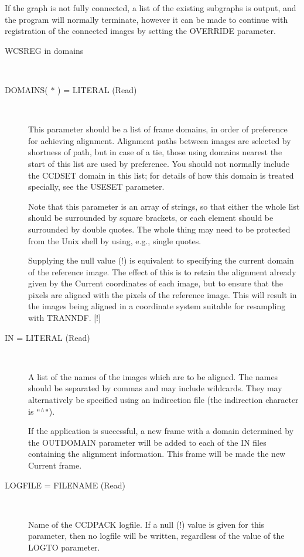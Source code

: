 \documentclass[twoside,11pt]{article}
\newcommand{\htmlref}[2]{#1}
\renewcommand{\_}{\texttt{\symbol{95}}}
\newcommand{\qt}[1]{{\tt "}#1{\tt "}}
\newcommand{\xroutine}[1]{\htmlref{{\sc #1}}{#1}}
\newcommand{\sstusage}[1]{\item[Usage:] \mbox{}
   \begin{description}
      {\ssttt \item #1}
   \end{description}
}
\newcommand{\sstparameters}[1]{
   \item[Parameters:] \mbox{} \\
   \vspace{-3.5ex}
   \begin{description}
      #1
   \end{description}
}
\newcommand{\sstsubsection}[1]{ \item[{#1}] \mbox{} \\}
\newcommand{\sstusage}[1]{\item[Usage:]
      \begin{description}
         {\ssttt #1}
      \end{description}
      \\
   }
\newcommand{\sstparameters}[1]{
      \item[Parameters:] \\
      \begin{description}
         #1
      \end{description}
      \\
   }
\newcommand{\sstsubsection}[1]{\item[{#1}]}
\begin{document}
{{      If the graph is not fully connected, a list of the existing
      subgraphs is output, and the program will normally terminate,
      however it can be made to continue with registration of the
      connected images by setting the OVERRIDE parameter.
   }
   \sstusage{
      WCSREG in domains
   }
   \sstparameters{
      \sstsubsection{
         DOMAINS( $*$ ) = LITERAL (Read)
      } {
         This parameter should be a list of frame domains, in order
         of preference for achieving alignment.  Alignment paths
         between images are selected by shortness of path, but in case
         of a tie, those using domains nearest the start of this list
         are used by preference.  You should not normally include the
         CCD\_SET domain in this list; for details of how this domain
         is treated specially, see the USESET parameter.

         Note that this parameter is an array of strings, so that either
         the whole list should be surrounded by square brackets, or
         each element should be surrounded by double quotes.  The
         whole thing may need to be protected from the Unix shell
         by using, e.g., single quotes.

         Supplying the null value (!) is equivalent to specifying the
         current domain of the reference image.  The effect of this
         is to retain the alignment already given by the Current
         coordinates of each image, but to ensure that the pixels
         are aligned with the pixels of the reference image.
         This will result in the images being aligned in a coordinate
         system suitable for resampling with \xroutine{TRANNDF}.
         [!]
      }
      \sstsubsection{
         IN = LITERAL (Read)
      } {
          A list of the names of the images which are to be aligned.  The
          names should be separated by commas and may include wildcards.
          They may alternatively be specified using an indirection file
          (the indirection character is \qt{$^\wedge$}).

          If the application is successful, a new frame with a domain
          determined by the OUTDOMAIN parameter will be added to each of
          the IN files containing the alignment information.  This frame 
          will be made the new Current frame.
       }
      \sstsubsection{
         LOGFILE = FILENAME (Read)
      } {
         Name of the CCDPACK logfile.  If a null (!) value is given for
         this parameter, then no logfile will be written, regardless of
         the value of the LOGTO parameter.

}}}
\end{document}

